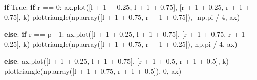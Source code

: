 \documentclass[
]{article}
\newenvironment{Shaded}{\begin{snugshade}}{\end{snugshade}}
\newcommand{\ControlFlowTok}[1]{\textcolor[rgb]{0.00,0.23,0.31}{\textbf{#1}}}
\newcommand{\DecValTok}[1]{\textcolor[rgb]{0.68,0.00,0.00}{#1}}
\newcommand{\FloatTok}[1]{\textcolor[rgb]{0.68,0.00,0.00}{#1}}
\newcommand{\NormalTok}[1]{\textcolor[rgb]{0.00,0.23,0.31}{#1}}
\newcommand{\OperatorTok}[1]{\textcolor[rgb]{0.37,0.37,0.37}{#1}}
\newcommand{\StringTok}[1]{\textcolor[rgb]{0.13,0.47,0.30}{#1}}
\newcommand{\VariableTok}[1]{\textcolor[rgb]{0.07,0.07,0.07}{#1}}
\begin{document}
\begin{Shaded}
\begin{Highlighting}[]
                \ControlFlowTok{if} \VariableTok{True}\NormalTok{:}
                    \ControlFlowTok{if}\NormalTok{ r }\OperatorTok{==} \DecValTok{0}\NormalTok{:}
\NormalTok{                        ax.plot([l }\OperatorTok{+} \DecValTok{1} \OperatorTok{+} \FloatTok{0.25}\NormalTok{, l }\OperatorTok{+} \DecValTok{1} \OperatorTok{+} \FloatTok{0.75}\NormalTok{], [r }\OperatorTok{+} \DecValTok{1} \OperatorTok{+} \FloatTok{0.25}\NormalTok{, r }\OperatorTok{+} \DecValTok{1} \OperatorTok{+} \FloatTok{0.75}\NormalTok{], }\StringTok{\textquotesingle{}k\textquotesingle{}}\NormalTok{)}
\NormalTok{                        plottriangle(np.array([l }\OperatorTok{+} \DecValTok{1} \OperatorTok{+} \FloatTok{0.75}\NormalTok{, r }\OperatorTok{+} \DecValTok{1} \OperatorTok{+} \FloatTok{0.75}\NormalTok{]), }\OperatorTok{{-}}\NormalTok{np.pi }\OperatorTok{/} \DecValTok{4}\NormalTok{, ax)}
                        
                    \ControlFlowTok{else}\NormalTok{:}
                        \ControlFlowTok{if}\NormalTok{ r }\OperatorTok{==}\NormalTok{ p }\OperatorTok{{-}} \DecValTok{1}\NormalTok{:}
\NormalTok{                            ax.plot([l }\OperatorTok{+} \DecValTok{1} \OperatorTok{+} \FloatTok{0.25}\NormalTok{, l }\OperatorTok{+} \DecValTok{1} \OperatorTok{+} \FloatTok{0.75}\NormalTok{], [r }\OperatorTok{+} \DecValTok{1} \OperatorTok{+} \FloatTok{0.75}\NormalTok{, r }\OperatorTok{+} \DecValTok{1} \OperatorTok{+} \FloatTok{0.25}\NormalTok{], }\StringTok{\textquotesingle{}k\textquotesingle{}}\NormalTok{)}
\NormalTok{                            plottriangle(np.array([l }\OperatorTok{+} \DecValTok{1} \OperatorTok{+} \FloatTok{0.75}\NormalTok{, r }\OperatorTok{+} \DecValTok{1} \OperatorTok{+} \FloatTok{0.25}\NormalTok{]), np.pi }\OperatorTok{/} \DecValTok{4}\NormalTok{, ax)}
                            
                        \ControlFlowTok{else}\NormalTok{:}
\NormalTok{                            ax.plot([l }\OperatorTok{+} \DecValTok{1} \OperatorTok{+} \FloatTok{0.25}\NormalTok{, l }\OperatorTok{+} \DecValTok{1} \OperatorTok{+} \FloatTok{0.75}\NormalTok{], [r }\OperatorTok{+} \DecValTok{1} \OperatorTok{+} \FloatTok{0.5}\NormalTok{, r }\OperatorTok{+} \DecValTok{1} \OperatorTok{+} \FloatTok{0.5}\NormalTok{], }\StringTok{\textquotesingle{}k\textquotesingle{}}\NormalTok{)}
\NormalTok{                            plottriangle(np.array([l }\OperatorTok{+} \DecValTok{1} \OperatorTok{+} \FloatTok{0.75}\NormalTok{, r }\OperatorTok{+} \DecValTok{1} \OperatorTok{+} \FloatTok{0.5}\NormalTok{]), }\DecValTok{0}\NormalTok{, ax)}
                            


\end{Highlighting}
\end{Shaded}
\end{document}
